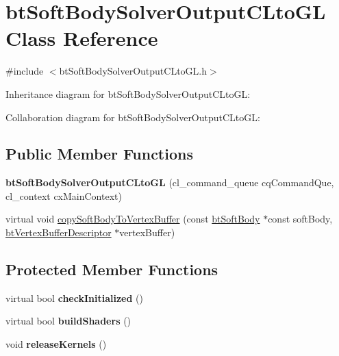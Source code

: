 \hypertarget{classbt_soft_body_solver_output_c_lto_g_l}{\section{bt\+Soft\+Body\+Solver\+Output\+C\+Lto\+G\+L Class Reference}
\label{classbt_soft_body_solver_output_c_lto_g_l}
}


{\ttfamily \#include $<$bt\+Soft\+Body\+Solver\+Output\+C\+Lto\+G\+L.\+h$>$}



Inheritance diagram for bt\+Soft\+Body\+Solver\+Output\+C\+Lto\+G\+L\+:


Collaboration diagram for bt\+Soft\+Body\+Solver\+Output\+C\+Lto\+G\+L\+:
\subsection*{Public Member Functions}
\begin{DoxyCompactItemize}
\item 
\hypertarget{classbt_soft_body_solver_output_c_lto_g_l_a38b710a54d801ca771a192e0fdddeee0}{{\bfseries bt\+Soft\+Body\+Solver\+Output\+C\+Lto\+G\+L} (cl\+\_\+command\+\_\+queue cq\+Command\+Que, cl\+\_\+context cx\+Main\+Context)}\label{classbt_soft_body_solver_output_c_lto_g_l_a38b710a54d801ca771a192e0fdddeee0}

\item 
virtual void \hyperlink{classbt_soft_body_solver_output_c_lto_g_l_ab6f232898b815166551373a6c2d95b58}{copy\+Soft\+Body\+To\+Vertex\+Buffer} (const \hyperlink{classbt_soft_body}{bt\+Soft\+Body} $\ast$const soft\+Body, \hyperlink{classbt_vertex_buffer_descriptor}{bt\+Vertex\+Buffer\+Descriptor} $\ast$vertex\+Buffer)
\end{DoxyCompactItemize}
\subsection*{Protected Member Functions}
\begin{DoxyCompactItemize}
\item 
\hypertarget{classbt_soft_body_solver_output_c_lto_g_l_aa0a1401e61bfb5856789cdc83e8b35ba}{virtual bool {\bfseries check\+Initialized} ()}\label{classbt_soft_body_solver_output_c_lto_g_l_aa0a1401e61bfb5856789cdc83e8b35ba}

\item 
\hypertarget{classbt_soft_body_solver_output_c_lto_g_l_a79b30ac51a34a83bff1157d0fc6192da}{virtual bool {\bfseries build\+Shaders} ()}\label{classbt_soft_body_solver_output_c_lto_g_l_a79b30ac51a34a83bff1157d0fc6192da}

\item 
\hypertarget{classbt_soft_body_solver_output_c_lto_g_l_ab00f748915e812c08e2d21746b09b877}{void {\bfseries release\+Kernels} ()}\label{classbt_soft_body_solver_output_c_lto_g_l_ab00f748915e812c08e2d21746b09b877}

\end{DoxyCompactItemize}
